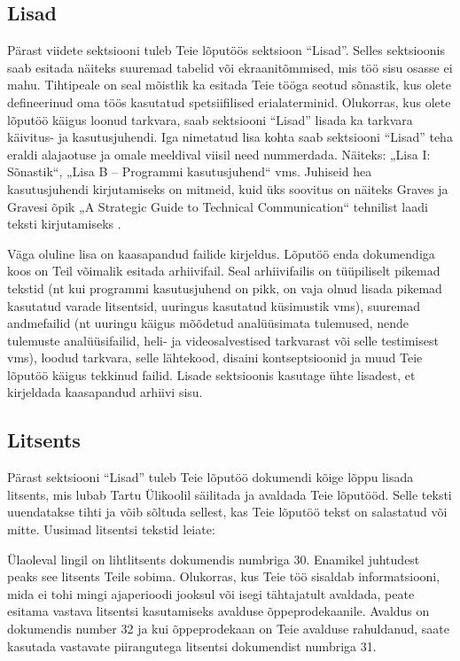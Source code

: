 \subsection{Lisad}
Pärast viidete sektsiooni tuleb Teie lõputöös sektsioon “Lisad”. Selles sektsioonis saab esitada näiteks suuremad tabelid või ekraanitõmmised, mis töö sisu osasse ei mahu. Tihtipeale on seal mõistlik ka esitada Teie tööga seotud sõnastik, kus olete defineerinud oma töös kasutatud spetsiifilised erialaterminid. Olukorras, kus olete lõputöö käigus loonud tarkvara, saab sektsiooni “Lisad” lisada ka tarkvara käivitus- ja kasutusjuhendi. Iga nimetatud lisa kohta saab sektsiooni “Lisad” teha eraldi alajaotuse ja omale meeldival viisil need nummerdada. Näiteks: „Lisa I: Sõnastik“, „Lisa B – Programmi kasutusjuhend“ vms. Juhiseid hea kasutusjuhendi kirjutamiseks on mitmeid, kuid üks soovitus on näiteks Graves ja Gravesi õpik „A Strategic Guide to Technical Communication“ tehnilist laadi teksti kirjutamiseks \cite{graves_strategic_2012}. 

Väga oluline lisa on kaasapandud failide kirjeldus. Lõputöö enda dokumendiga koos on Teil võimalik esitada arhiivifail. Seal arhiivifailis on tüüpiliselt pikemad tekstid (nt kui programmi kasutusjuhend on pikk, on vaja olnud lisada pikemad kasutatud varade litsentsid, uuringus kasutatud küsimustik vms), suuremad andmefailid (nt uuringu käigus mõõdetud analüüsimata tulemused, nende tulemuste analüüsifailid, heli- ja videosalvestised tarkvarast või selle testimisest vms), loodud tarkvara, selle lähtekood, disaini kontseptsioonid ja muud Teie lõputöö käigus tekkinud failid. Lisade sektsioonis kasutage ühte lisadest, et kirjeldada kaasapandud arhiivi sisu.

\subsection{Litsents} \label{subchapter:litsents}
Pärast sektsiooni “Lisad” tuleb Teie lõputöö dokumendi kõige lõppu lisada litsents, mis lubab Tartu Ülikoolil säilitada ja avaldada Teie lõputööd. Selle teksti uuendatakse tihti ja võib sõltuda sellest, kas Teie lõputöö tekst on salastatud või mitte. Uusimad litsentsi tekstid leiate: 

Ülaoleval lingil on lihtlitsents dokumendis numbriga 30. Enamikel juhtudest peaks see litsents Teile sobima. Olukorras, kus Teie töö sisaldab informatsiooni, mida ei tohi mingi ajaperioodi jooksul või isegi tähtajatult avaldada, peate esitama vastava litsentsi kasutamiseks avalduse õppeprodekaanile. Avaldus on dokumendis number 32 ja kui õppeprodekaan on Teie avalduse rahuldanud, saate kasutada vastavate piirangutega litsentsi dokumendist numbriga 31.

